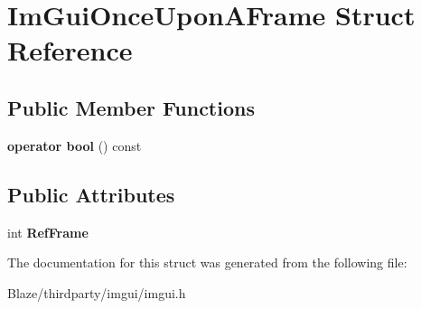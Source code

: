\hypertarget{structImGuiOnceUponAFrame}{}\section{Im\+Gui\+Once\+Upon\+A\+Frame Struct Reference}
\label{structImGuiOnceUponAFrame}
\subsection*{Public Member Functions}
\begin{DoxyCompactItemize}
\item 
\mbox{\label{structImGuiOnceUponAFrame_a3c912b79bc333ce746356001431c2504}} 
{\bfseries operator bool} () const
\end{DoxyCompactItemize}
\subsection*{Public Attributes}
\begin{DoxyCompactItemize}
\item 
\mbox{\label{structImGuiOnceUponAFrame_a2d44776b8e7bdeec217f88be9f832e08}} 
int {\bfseries Ref\+Frame}
\end{DoxyCompactItemize}


The documentation for this struct was generated from the following file\+:\begin{DoxyCompactItemize}
\item 
Blaze/thirdparty/imgui/imgui.\+h\end{DoxyCompactItemize}
